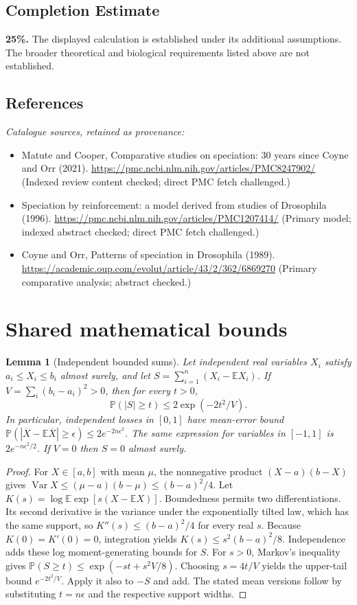 \documentclass[11pt]{article}
\newcommand{\E}{\mathbb E}
\newcommand{\Prob}{\mathbb P}
\DeclareMathOperator{\Var}{Var}
\providecommand{\E}{\mathbb E}
\providecommand{\Prob}{\mathbb P}
\providecommand{\Var}{\operatorname{Var}}
\newtheorem{sharedlemma}{Lemma}[section]
\begin{document}
\subsection{Completion Estimate}
\textbf{25\%.} The displayed calculation is established under its additional assumptions. The broader theoretical and biological requirements listed above are not established.
\subsection{References}
\noindent\emph{Catalogue sources, retained as provenance:}
\begin{itemize}
\item Matute and Cooper, Comparative studies on speciation: 30 years since Coyne and Orr (2021). \url{https://pmc.ncbi.nlm.nih.gov/articles/PMC8247902/} (Indexed review content checked; direct PMC fetch challenged.)
\item Speciation by reinforcement: a model derived from studies of Drosophila (1996). \url{https://pmc.ncbi.nlm.nih.gov/articles/PMC1207414/} (Primary model; indexed abstract checked; direct PMC fetch challenged.)
\item Coyne and Orr, Patterns of speciation in Drosophila (1989). \url{https://academic.oup.com/evolut/article/43/2/362/6869270} (Primary comparative analysis; abstract checked.)
\end{itemize}
\clearpage


\appendix
\section{Shared mathematical bounds}\label{app:bounds}
\begin{sharedlemma}[Independent bounded sums]\label{lem:bounded}
Let independent real variables $X_i$ satisfy $a_i\leq X_i\leq b_i$ almost surely,
and let $S=\sum_{i=1}^n(X_i-\E X_i)$. If
$V=\sum_i(b_i-a_i)^2>0$, then for every $t>0$,
\[
 \Prob(|S|\geq t)\leq 2\exp(-2t^2/V).
\]
In particular, independent losses in $[0,1]$ have mean-error bound
$\Prob(|\overline X-\E\overline X|\geq\epsilon)
\leq2e^{-2n\epsilon^2}$. The same expression for variables in $[-1,1]$
is $2e^{-n\epsilon^2/2}$. If $V=0$ then $S=0$ almost surely.
\end{sharedlemma}
\begin{proof}
For $X\in[a,b]$ with mean $\mu$, the nonnegative product
$(X-a)(b-X)$ gives
$\Var X\leq(\mu-a)(b-\mu)\leq(b-a)^2/4$.
Let $K(s)=\log\E\exp[s(X-\E X)]$.
Boundedness permits two differentiations. Its second derivative is the variance
under the exponentially tilted law, which has the same support, so
$K''(s)\leq(b-a)^2/4$ for every real $s$.
Because $K(0)=K'(0)=0$, integration yields
$K(s)\leq s^2(b-a)^2/8$.
Independence adds these log moment-generating bounds for $S$.
For $s>0$, Markov's inequality gives
$\Prob(S\geq t)\leq\exp(-st+s^2V/8)$.
Choosing $s=4t/V$ yields the upper-tail bound $e^{-2t^2/V}$.
Apply it also to $-S$ and add. The stated mean versions follow by substituting
$t=n\epsilon$ and the respective support widths.
\end{proof}
\end{document}
